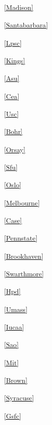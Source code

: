 \begin{multicols}{2}
\noindent
\textsuperscript{\ref{Madison}}\Madisontext

\noindent
\textsuperscript{\ref{Santabarbara}}\Santabarbaratext

\noindent
\textsuperscript{\ref{Lpsc}}\Lpsctext

\noindent
\textsuperscript{\ref{Kings}}\Kingstext

\noindent
\textsuperscript{\ref{Asu}}\Asutext

\noindent
\textsuperscript{\ref{Cea}}\Ceatext

\noindent
\textsuperscript{\ref{Usc}}\Usctext

\noindent
\textsuperscript{\ref{Bohr}}\Bohrtext

\noindent
\textsuperscript{\ref{Orsay}}\Orsaytext

\noindent
\textsuperscript{\ref{Sfu}}\Sfutext

\noindent
\textsuperscript{\ref{Oslo}}\Oslotext

\noindent
\textsuperscript{\ref{Melbourne}}\Melbournetext

\noindent
\textsuperscript{\ref{Case}}\Casetext

\noindent
\textsuperscript{\ref{Pennstate}}\Pennstatetext

\noindent
\textsuperscript{\ref{Brookhaven}}\Brookhaventext

\noindent
\textsuperscript{\ref{Swarthmore}}\Swarthmoretext

\noindent
\textsuperscript{\ref{Hpd}}\Hpdtext

\noindent
\textsuperscript{\ref{Umass}}\Umasstext

\noindent
\textsuperscript{\ref{Iucaa}}\Iucaatext

\noindent
\textsuperscript{\ref{Sao}}\Saotext

\noindent
\textsuperscript{\ref{Mit}}\Mittext

\noindent
\textsuperscript{\ref{Brown}}\Browntext

\noindent
\textsuperscript{\ref{Syracuse}}\Syracusetext

\noindent
\textsuperscript{\ref{Gsfc}}\Gsfctext

\normalsize

\end{multicols}

\parskip=8pt
